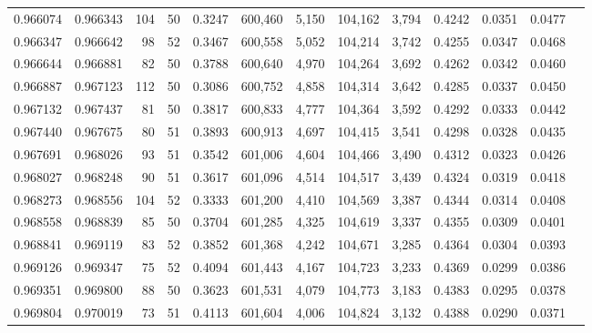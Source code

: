 \begin{tabular}{rrrrrrrrrrrrr}
0.966074 & 0.966343 &   104 &  50 &                                     0.3247 & 600,460 &   5,150 & 104,162 &   3,794 & 0.4242 & 0.0351 & 0.0477 \\
0.966347 & 0.966642 &    98 &  52 &                                     0.3467 & 600,558 &   5,052 & 104,214 &   3,742 & 0.4255 & 0.0347 & 0.0468 \\
0.966644 & 0.966881 &    82 &  50 &                                     0.3788 & 600,640 &   4,970 & 104,264 &   3,692 & 0.4262 & 0.0342 & 0.0460 \\
0.966887 & 0.967123 &   112 &  50 &                                     0.3086 & 600,752 &   4,858 & 104,314 &   3,642 & 0.4285 & 0.0337 & 0.0450 \\
0.967132 & 0.967437 &    81 &  50 &                                     0.3817 & 600,833 &   4,777 & 104,364 &   3,592 & 0.4292 & 0.0333 & 0.0442 \\
0.967440 & 0.967675 &    80 &  51 &                                     0.3893 & 600,913 &   4,697 & 104,415 &   3,541 & 0.4298 & 0.0328 & 0.0435 \\
0.967691 & 0.968026 &    93 &  51 &                                     0.3542 & 601,006 &   4,604 & 104,466 &   3,490 & 0.4312 & 0.0323 & 0.0426 \\
0.968027 & 0.968248 &    90 &  51 &                                     0.3617 & 601,096 &   4,514 & 104,517 &   3,439 & 0.4324 & 0.0319 & 0.0418 \\
0.968273 & 0.968556 &   104 &  52 &                                     0.3333 & 601,200 &   4,410 & 104,569 &   3,387 & 0.4344 & 0.0314 & 0.0408 \\
0.968558 & 0.968839 &    85 &  50 &                                     0.3704 & 601,285 &   4,325 & 104,619 &   3,337 & 0.4355 & 0.0309 & 0.0401 \\
0.968841 & 0.969119 &    83 &  52 &                                     0.3852 & 601,368 &   4,242 & 104,671 &   3,285 & 0.4364 & 0.0304 & 0.0393 \\
0.969126 & 0.969347 &    75 &  52 &                                     0.4094 & 601,443 &   4,167 & 104,723 &   3,233 & 0.4369 & 0.0299 & 0.0386 \\
0.969351 & 0.969800 &    88 &  50 &                                     0.3623 & 601,531 &   4,079 & 104,773 &   3,183 & 0.4383 & 0.0295 & 0.0378 \\
0.969804 & 0.970019 &    73 &  51 &                                     0.4113 & 601,604 &   4,006 & 104,824 &   3,132 & 0.4388 & 0.0290 & 0.0371 \\

\end{tabular}
